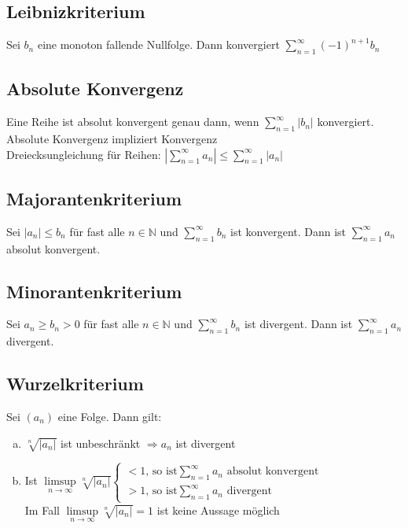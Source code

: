 \documentclass{article}
\begin{document}
\subsection{Leibnizkriterium}
Sei $b_n$ eine monoton fallende Nullfolge. Dann konvergiert $\sum \limits_{n=1}^{\infty} (-1)^{n+1} b_n$

\subsection{Absolute Konvergenz}
Eine Reihe ist absolut konvergent genau dann, wenn $\sum \limits_{n=1}^{\infty} |b_n|$ konvergiert.
Absolute Konvergenz impliziert Konvergenz \\
Dreiecksungleichung für Reihen: $|\sum \limits_{n=1}^{\infty} a_n| \leq \sum \limits_{n=1}^{\infty} |a_n|$

\subsection{Majorantenkriterium}
Sei $|a_n| \leq b_n$ für fast alle $n \in \mathbb{N}$ und $\sum \limits_{n=1}^{\infty} b_n$ ist konvergent.
Dann ist $\sum \limits_{n=1}^{\infty} a_n$ absolut konvergent.

\subsection{Minorantenkriterium}
Sei $a_n \geq b_n > 0$ für fast alle $n \in \mathbb{N}$ und $\sum \limits_{n=1}^{\infty} b_n$ ist divergent.
Dann ist $\sum \limits_{n=1}^{\infty} a_n$ divergent.

\subsection{Wurzelkriterium}
Sei $(a_n)$ eine Folge. Dann gilt:
\begin{enumerate}[a)]
    \item $\sqrt[n]{|a_n|}$ ist unbeschränkt $\Rightarrow a_n$ ist divergent
    \item Ist $\limsup \limits_{n \to \infty} \sqrt[n]{|a_n|}
    \begin{cases} <1 \text{, so ist} \sum \limits_{n=1}^{\infty} a_n \text{ absolut konvergent} \\
    > 1 \text{, so ist}  \sum \limits_{n=1}^{\infty} a_n \text{ divergent} \end{cases}$ \\
    Im Fall $\limsup \limits_{n \to \infty} \sqrt[n]{|a_n|} = 1$ ist keine Aussage möglich
\end{enumerate}
\end{document}
